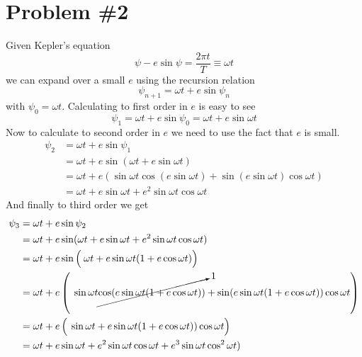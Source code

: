 \documentclass[11pt]{article}
\numberwithin{equation}{section}
\begin{document}
\pagebreak

\section{Problem \#2}
Given Kepler's equation
\begin{equation}
\psi - e\sin\psi = \frac{2\pi t}{T}\equiv\omega t
\label{Keps}
\end{equation}
we can expand over a small $e$ using the recursion relation 
\begin{equation}
\psi_{n+1} = \omega t + e\sin\psi_n
\label{Recur}
\end{equation}
with $\psi_0=\omega t$. Calculating to first order in $e$ is easy to see
$$\psi_1 = \omega t + e\sin\psi_0 = \omega t +e \sin\omega t$$
Now to calculate to second order in $e$ we need to use the fact that $e$ is small.
\begin{align*}
\psi_2 &= \omega t + e\sin\psi_1 \\
&= \omega t +e \sin(\omega t + e\sin\omega t)\\
&= \omega t +e(\sin\omega t \cos(e\sin\omega t)+ \sin(e\sin\omega t)\cos\omega t)\\
&= \omega t +e\sin\omega t + e^2\sin\omega t\cos\omega t
\end{align*}
And finally to third order we get
\begin{align*}
\psi_3 &= \omega t + e\sin\psi_2\\
&= \omega t + e\sin(\omega t +e\sin\omega t + e^2\sin\omega t\cos\omega t)\\
&= \omega t + e\sin\left(\frac{}{}\omega t +e\sin\omega t(1 + e\cos\omega t)\right)\\
&= \omega t + e\left(\frac{}{}\sin\omega t\cancelto{1}{\cos(e\sin\omega t(1 + e\cos\omega t))} + \sin(e\sin\omega t(1 + e\cos\omega t))\cos\omega t\right)\\
&= \omega t + e\left(\frac{}{}\sin\omega t + e\sin\omega t(1 + e\cos\omega t))\cos\omega t\right)\\
&= \omega t + e\sin\omega t + e^2\sin\omega t\cos\omega t + e^3\sin\omega t\cos^2\omega t)
\end{align*}
\pagebreak
\end{document}
